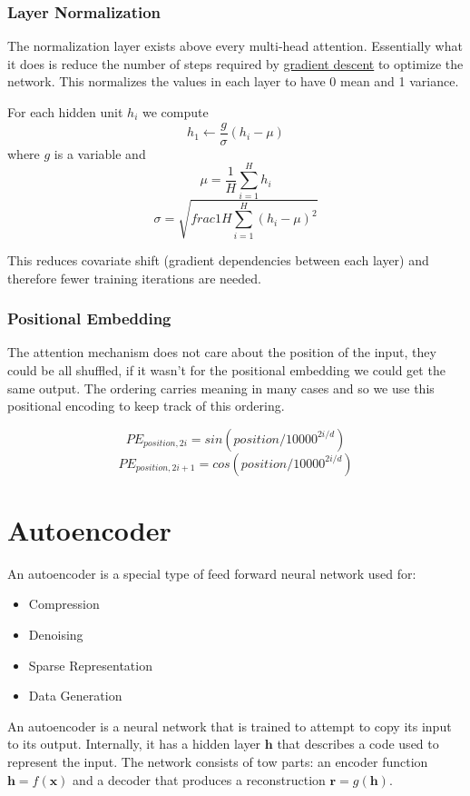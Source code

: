 \documentclass[12pt]{article}
\begin{document}
        \subsubsection{Layer Normalization}
            The normalization layer exists above every multi-head attention. Essentially what it does is reduce the
            number of steps required by \hyperref[sec:GD]{gradient descent} to optimize the network. This normalizes the
            values in each layer to have 0 mean and 1 variance. 

            For each hidden unit $h_i$ we compute
            $$ h_1 \leftarrow \frac{g}{\sigma}(h_i - \mu)$$
            where $g$ is a variable and
            $$ \mu = \frac{1}{H} \sum_{i=1}^{H} h_i $$
            $$ \sigma = \sqrt{frac{1}{H} \sum_{i=1}^{H} (h_i-\mu)^2}$$

            This reduces covariate shift (gradient dependencies between each layer) and therefore fewer training
            iterations are needed.

        \subsubsection{Positional Embedding}
            The attention mechanism does not care about the position of the input, they could be all shuffled, if it
            wasn't for the positional embedding we could get the same output. The ordering carries meaning in many cases
            and so we use this positional encoding to keep track of this ordering.

            $$ PE_{position,2i} = sin(position/10000^{2i/d}) $$
            $$ PE_{position,2i+1} = cos(position/10000^{2i/d}) $$

\section{Autoencoder}
    An autoencoder is a special type of feed forward neural network used for:
    \begin{itemize}
        \item Compression
        \item Denoising
        \item Sparse Representation
        \item Data Generation
    \end{itemize}

    An autoencoder is a neural network that is trained to attempt to copy its input to its output. Internally, it has a
    hidden layer $\boldsymbol{h}$ that describes a code used to represent the input. The network consists of tow parts: an encoder
    function $\boldsymbol{h} = f(\boldsymbol{x})$ and a decoder that produces a reconstruction $\boldsymbol{r} =
    g(\boldsymbol{h})$.
    
\end{document}
